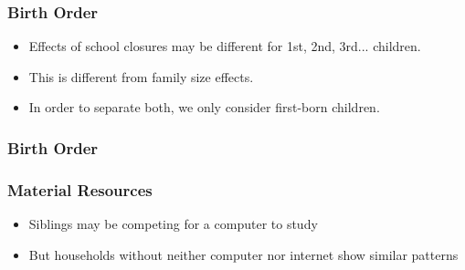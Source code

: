 \documentclass{beamer}
\begin{document}
\begin{frame}
    \label{frame:birthorder}
    \frametitle{Birth Order}
       \begin{itemize}
           \item Effects of school closures may be different for 1st, 2nd, 3rd... children.
           \item This is different from family size effects.
           \item In order to separate both, we only consider first-born children.
       \end{itemize}
\end{frame}

\begin{frame}
    \label{frame:birthorder_intro}
    \frametitle{Birth Order}
        {
    }  

    \begin{flushleft}
        \hyperlink{frame:mechanisms}{}
    \end{flushleft}
\end{frame}


\begin{frame}
    \label{frame:resources_intro}
    \frametitle{Material Resources}
       \begin{itemize}
           \item Siblings may be competing for a computer to study
           \item But households without neither computer nor internet show similar patterns 
       \end{itemize}
\end{frame}
\end{document}

